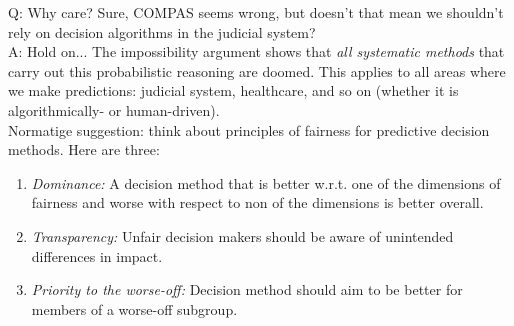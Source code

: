 Q: Why care? Sure, COMPAS seems wrong, but doesn't that mean we shouldn't rely on decision algorithms in the judicial system? \\

A: Hold on... The impossibility argument shows that {\it all systematic methods} that carry out this probabilistic reasoning are doomed. This applies to all areas where we make predictions: judicial system, healthcare, and so on (whether it is algorithmically- or human-driven). \\

Normatige suggestion: think about principles of fairness for predictive decision methods. Here are three:
\begin{enumerate}
	\item {\it Dominance:} A decision method that is better w.r.t. one of the dimensions of fairness and worse with respect to non of the dimensions is better overall.
	\item {\it Transparency:} Unfair decision makers should be aware of unintended differences in impact.
	\item {\it Priority to the worse-off:} Decision method should aim to be better for members of a worse-off subgroup.
\end{enumerate}


\spacerule







